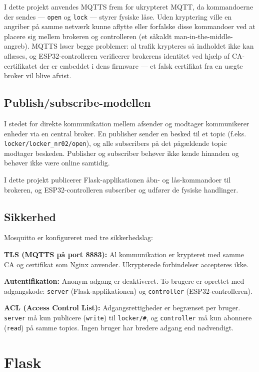 \documentclass[a4paper,12pt]{article}
\begin{document}
I dette projekt anvendes MQTTS frem for ukrypteret MQTT, da kommandoerne der sendes — \texttt{open} og \texttt{lock} — styrer fysiske låse. Uden kryptering ville en angriber på samme netværk kunne aflytte eller forfalske disse kommandoer ved at placere sig mellem brokeren og controlleren (et såkaldt man-in-the-middle-angreb). MQTTS løser begge problemer: al trafik krypteres så indholdet ikke kan aflæses, og ESP32-controlleren verificerer brokerens identitet ved hjælp af CA-certifikatet der er embeddet i dens firmware — et falsk certifikat fra en uægte broker vil blive afvist.

\subsection{Publish/subscribe-modellen}

I stedet for direkte kommunikation mellem afsender og modtager kommunikerer enheder via en central broker. En publisher sender en besked til et topic (f.eks. \texttt{locker/locker\_nr02/open}), og alle subscribers på det pågældende topic modtager beskeden. Publisher og subscriber behøver ikke kende hinanden og behøver ikke være online samtidig.

I dette projekt publicerer Flask-applikationen åbn- og lås-kommandoer til brokeren, og ESP32-controlleren subscriber og udfører de fysiske handlinger.

\subsection{Sikkerhed}

Mosquitto er konfigureret med tre sikkerhedslag:

\textbf{TLS (MQTTS på port 8883):} Al kommunikation er krypteret med samme CA og certifikat som Nginx anvender. Ukrypterede forbindelser accepteres ikke.

\textbf{Autentifikation:} Anonym adgang er deaktiveret. To brugere er oprettet med adgangskode: \texttt{server} (Flask-applikationen) og \texttt{controller} (ESP32-controlleren).

\textbf{ACL (Access Control List):} Adgangsrettigheder er begrænset per bruger. \texttt{server} må kun publicere (\texttt{write}) til \texttt{locker/\#}, og \texttt{controller} må kun abonnere (\texttt{read}) på samme topics. Ingen bruger har bredere adgang end nødvendigt.

\section{Flask}
\end{document}
